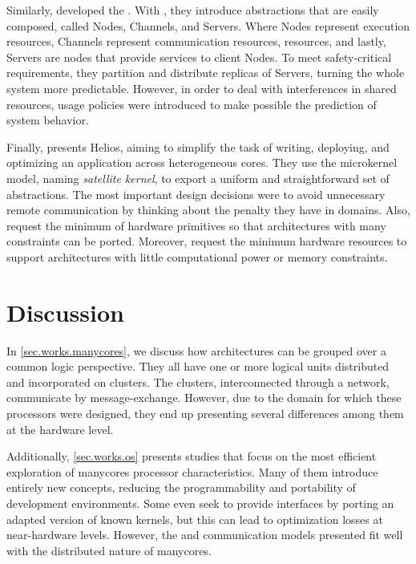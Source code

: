	Similarly,  developed the \moosca.
	With \moosca, they introduce abstractions that are easily composed, called Nodes,
	Channels, and Servers.
	Where Nodes represent execution resources, Channels represent communication
	resources, \eg \noc resources, and lastly, Servers are nodes that provide
	services to client Nodes.
	To meet safety-critical requirements, they partition \manycore and distribute
	replicas of Servers, turning the whole system more predictable.
	However, in order to deal with interferences in shared resources,
	usage policies were introduced to make possible the prediction of system behavior.

	Finally,  presents  Helios, aiming to
	simplify the task of writing, deploying, and optimizing an application across
	heterogeneous cores.
	They use the microkernel model, naming \textit{satellite kernel}, to export
	a uniform and straightforward set of \os abstractions.
	The most important design decisions were to avoid unnecessary remote communication
	by thinking about the penalty they have in \numa domains.
	Also, request the minimum of hardware primitives so that architectures with many
	constraints can be ported.
	Moreover, request the minimum hardware resources to support architectures with little
	computational power or memory constraints.

\section{Discussion}

	In \autoref{sec.works.manycores}, we discuss how \manycore architectures can be
	grouped over a common logic perspective.
	They all have one or more logical units distributed and incorporated on clusters.
	The clusters, interconnected through a network, communicate by message-exchange.
	However, due to the domain for which these processors were designed, they end up
	presenting several differences among them at the hardware level.

	Additionally, \autoref{sec.works.os} presents \oss studies that focus
	on the most efficient exploration of manycores processor characteristics.
	Many of them introduce entirely new concepts, reducing the programmability
	and portability of development environments. Some even seek to provide
	\posix interfaces by porting an adapted version of known kernels, but
	this can lead to optimization losses at near-hardware levels.
	However, the \os and communication models presented fit well with the
	distributed nature of manycores.

